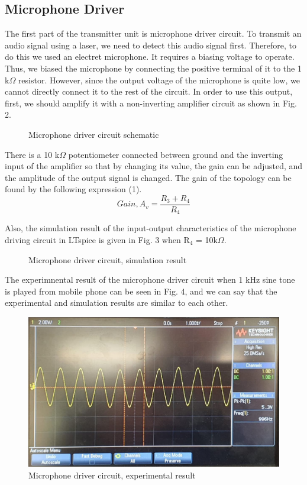 \documentclass[conference]{IEEEtran}
\begin{document}
\subsection{Microphone Driver}
The first part of the transmitter unit is microphone driver circuit. To transmit an audio signal using a laser, we need to detect this audio signal first. Therefore, to do this we used an electret microphone. It requires a biasing voltage to operate. Thus, we biased the microphone by connecting the positive terminal of it to the 1 k\(\Omega\) resistor. However, since the output voltage of the microphone is quite low, we cannot directly connect it to the rest of the circuit. In order to use this output, first, we should amplify it with a non-inverting amplifier circuit as shown in Fig. 2. 
 \begin{figure}[H]
   \centerline{}
    \caption{Microphone driver circuit schematic}
\end{figure}
 \par There is a 10 k\(\Omega\) potentiometer connected between ground and the inverting input of the amplifier so that by changing its value, the gain can be adjusted, and the amplitude of the output signal is changed. The gain of the topology can be found by the following expression (1).
\begin{equation}\label{eq:1}
        Gain, A_v = \frac{R_3+R_4}{R_4} 
 \end{equation}
\par Also, the simulation result of the input-output characteristics of the microphone driving circuit in LTspice is given in Fig. 3 when R\(_4\) = 10k\(\Omega\).
 \begin{figure}[H]
   \centerline{}
    \caption{Microphone driver circuit, simulation result}
\end{figure}
\par The experimnental result of the microphone driver circuit when 1 kHz sine tone is played from mobile phone can be seen in Fig. 4, and we can say that the experimental and simulation results are similar to each other. 
 \begin{figure}[H]
   \centerline{\includegraphics[scale=0.13]{microphone.png}}
    \caption{Microphone driver circuit, experimental result}
\end{figure} 
\end{document}
